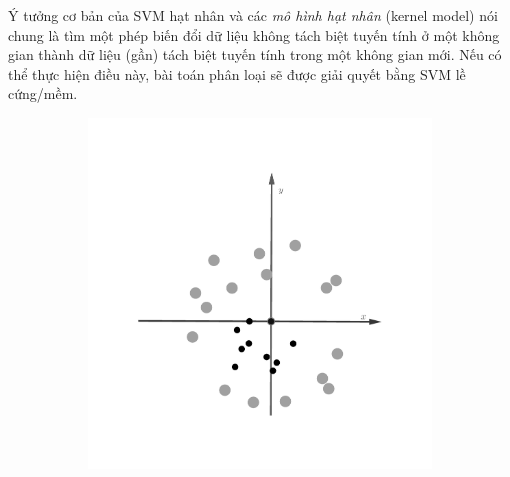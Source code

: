 Ý tưởng cơ bản của SVM hạt nhân và các \textit{mô hình hạt nhân} (kernel model) nói chung là tìm một phép biến đổi dữ liệu không tách biệt tuyến tính ở một không gian thành dữ liệu (gần) tách biệt tuyến tính trong một không gian mới. Nếu có thể thực hiện điều này, bài toán phân loại sẽ
được giải quyết bằng SVM lề cứng/mềm.



\begin{figure}[t]
\begin{subfigure}{0.325\textwidth}
\includegraphics[width=\linewidth]{Chapters/09_SupportVectorMachines/21_kernelsvm/42_gray.png} %
\caption{}
\end{subfigure}
\begin{subfigure}{0.325\textwidth}

\end{subfigure}
\end{figure}
